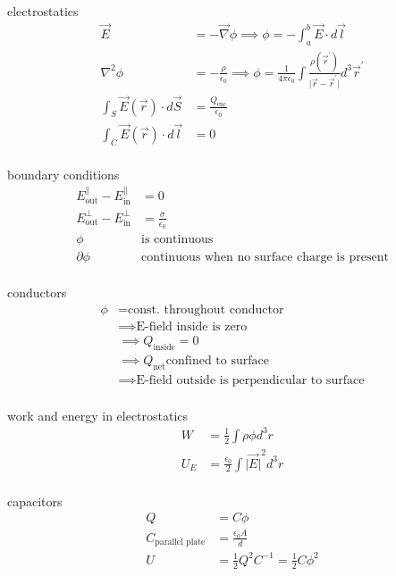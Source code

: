 \documentclass[avery5388, frame, grid]{flashcards}
\begin{document}
\begin{flashcard}{electrostatics}
  {
    \begin{align*}
      \vec{E} &= -\vec{\nabla} \phi \implies \phi = - \int_{a}^{b} \vec{E} \cdot d\vec{l}\\
      \nabla^{2} \phi &= - \frac{\rho}{\epsilon_{0}} \implies
      \phi = \frac{1}{4 \pi \epsilon_{0}} \int \frac{\rho(\vec{r}^{'})}{\lvert \vec{r} - \vec{r}^{'}\lvert} d^{3}\vec{r}^{'}\\
      \int_{S} \vec{E}(\vec{r}) \cdot d\vec{S} &= \frac{Q_{\textrm{enc}}}{\epsilon_{0}}\\
      \int_{C} \vec{E}(\vec{r}) \cdot d\vec{l} &= 0\\
    \end{align*}
  }
\end{flashcard}

\begin{flashcard}{boundary conditions}
  {
    \begin{align*}
      E^{\parallel}_{\textrm{out}} - E^{\parallel}_{\textrm{in}} &= 0\\
      E^{\bot}_{\textrm{out}} - E^{\bot}_{\textrm{in}} &= \frac{\sigma}{\epsilon_{0}}\\
      \phi &\textrm{is continuous}\\
      \partial \phi & \textrm{continuous when no surface charge is present}\\
    \end{align*}
  }
\end{flashcard}

\begin{flashcard}{conductors}
  {
    \begin{align*}
      \phi &= \textrm{const. throughout conductor}\\
      & \implies \textrm{E-field inside is zero}\\
      & \implies Q_{\textrm{inside}} = 0\\
      & \implies Q_{\textrm{net}} \textrm{confined to surface}\\
      & \implies \textrm{E-field outside is perpendicular to surface}\\
    \end{align*}
  }
\end{flashcard}

\begin{flashcard}{work and energy in electrostatics}
  {
    \begin{align*}
      W &= \frac{1}{2} \int \rho \phi d^{3}r\\
      U_{E} &= \frac{\epsilon_{0}}{2} \int {\lvert \vec{E} \lvert}^{2} d^{3}r\\
    \end{align*}
  }
\end{flashcard}

\begin{flashcard}{capacitors}
  {
    \begin{align*}
      Q &= C \phi\\
      C_{\textrm{parallel plate}} &= \frac{\epsilon_{0} A}{d}\\
      U &= \frac{1}{2} Q^{2} C^{-1} = \frac{1}{2} C \phi^{2}\\
    \end{align*}
  }
\end{flashcard}
\end{document}
